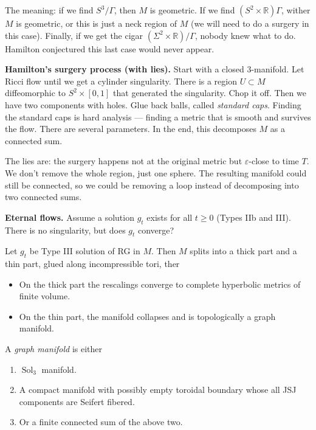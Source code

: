 \noindent
The meaning: if we find $S^3/\Gamma$,
then $M$ is geometric.
If we find $(S^2 \times \mathbb{R})\Gamma$,
wither $M$ is geometric, or this is just
a neck region of $M$ (we will need to 
do a surgery in this case).
Finally, if we get the cigar 
$(\Sigma^2 \times \mathbb{R})/\Gamma$,
nobody knew what to do. Hamilton
conjectured this last case would never
appear.

\medskip\noindent
{\bf Hamilton's surgery process
(with lies).}
Start with a closed $3$-manifold.
Let Ricci flow until we get a cylinder
singularity. There is a region $U \subset M$
diffeomorphic to $S^2 \times [0,1]$
that generated the singularity. Chop it off.
Then we have two components with holes.
Glue back balls, called {\it standard caps}.
Finding the standard caps is hard analysis
--- finding a metric that is smooth and
survives the flow. There are several
parameters.
In the end,
this decomposes $M$ as a connected sum.

The lies are: the surgery happens
not at the original metric but
$\varepsilon$-close to time $T$.
We don't remove the whole region, just
one sphere. The resulting manifold
could still be connected, so we could
be removing a loop instead of decomposing
into two connected sums.

\medskip\noindent
{\bf Eternal flows.}
Assume a solution $g_t$ exists for all
$t \geq 0$ (Types IIb  and III).
There is no singularity, but 
does $g_t$ converge?

\begin{theorem}[Hamilton, 1999]
\label{theorem-hamilton99}
Let $g_t$ be Type III solution of RG in $M$.
Then $M $ splits into a thick part and a
thin part, glued along incompressible tori,
ther
\begin{itemize}
\item On the thick part the rescalings
converge to complete hyperbolic metrics of
finite volume.
\item On the thin part, the manifold
collapses and is topologically a graph
manifold.
\end{itemize}
\end{theorem}

\noindent
A {\it graph manifold} is either
\begin{enumerate}
\item $\operatorname{Sol}_3$ manifold.
\item A compact manifold with possibly empty
toroidal boundary whose all JSJ components
are Seifert fibered.
\item Or a finite connected sum of the above
two.
\end{enumerate}

